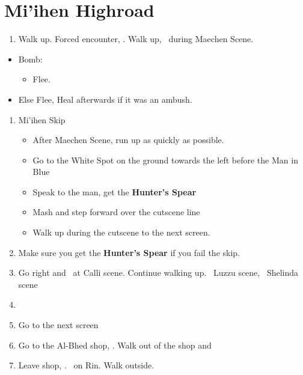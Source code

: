 \chapter{Mi'ihen Highroad}

\begin{enumerate}
  \item Walk up. Forced encounter, \sd. Walk up, \sd\ during Maechen Scene.
\end{enumerate}
\begin{encounters}
  \begin{itemize}
    \item Bomb:
          \begin{itemize}
            \kimahrif Lancet Bomb, learn \textbf{Self Destruct}
            \item Flee.
          \end{itemize}
    \item Else Flee,  Heal afterwards if it was an ambush.
  \end{itemize}
\end{encounters}
\begin{enumerate}[resume]
  \item {Mi'ihen Skip}
        \begin{itemize}
          \item After Maechen Scene, run up as quickly as possible.
          \item Go to the White Spot on the ground towards the left before the Man in Blue
          \item Speak to the man, get the \textbf{Hunter's Spear}
          \item Mash and step forward over the cutscene line
          \item Walk up during the cutscene to the next screen.
        \end{itemize}
  \item Make sure you get the \textbf{Hunter's Spear} if you fail the skip.
  \item Go right and \sd\ at Calli scene. Continue walking up. \sd\ Luzzu scene, \sd\ Shelinda scene
  \item \formation{\tidus}{\wakka}{\kimahri}
  \item Go to the next screen
  \item Go to the Al-Bhed shop, \sd. Walk out of the shop and \cs[5:30]
  \item Leave shop, \sd. \sd\ on Rin. Walk outside.
\end{enumerate}
